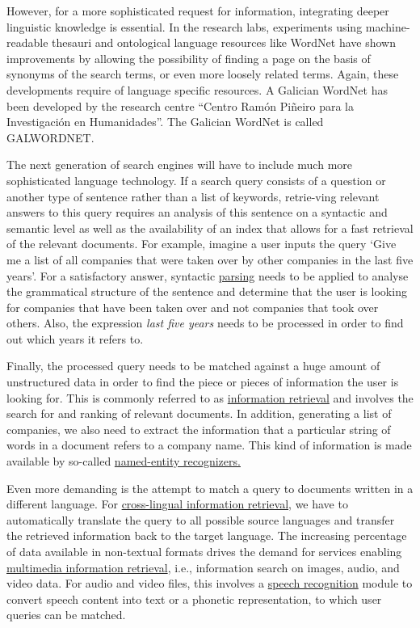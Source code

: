 \begin{multicols}{2}
\begin{itemize}
\begin{multicols}{2}
However, for a more sophisticated request for information, integrating deeper linguistic knowledge is essential. In the research labs, experiments using machine-readable thesauri and ontological language resources like WordNet have shown improvements by allowing the possibility of finding a page on the basis of synonyms of the search terms, or even more loosely related terms. Again, these developments require of language specific resources. A Galician WordNet has been developed by the research centre “Centro Ramón Piñeiro para la Investigación en Humanidades”\cite{GAL-Nota24}. The Galician WordNet is called GALWORDNET.

The next generation of search engines will have to include much more sophisticated language technology. If a search query consists of a question or another type of sentence rather than a list of keywords, retrie-ving relevant answers to this query requires an analysis of this sentence on a syntactic and semantic level as well as the availability of an index that allows for a fast retrieval of the relevant documents. For example, imagine a user inputs the query ‘Give me a list of all companies that were taken over by other companies in the last five years’. For a satisfactory answer, syntactic \uline{parsing} needs to be applied to analyse the grammatical structure of the sentence and determine that the user is looking for companies that have been taken over and not companies that took over others. Also, the expression \textit{last five years} needs to be processed in order to find out which years it refers to. 

Finally, the processed query needs to be matched against a huge amount of unstructured data in order to find the piece or pieces of information the user is looking for. This is commonly referred to as \uline{information retrieval} and involves the search for and ranking of relevant documents. In addition, generating a list of companies, we also need to extract the information that a particular string of words in a document refers to a company name. This kind of information is made available by so-called \uline{named-entity recognizers.} 

Even more demanding is the attempt to match a query to documents written in a different language. For \uline{cross-lingual information retrieval}, we have to automatically translate the query to all possible source languages and transfer the retrieved information back to the target language. The increasing percentage of data available in non-textual formats drives the demand for services enabling \uline{multimedia information retrieval}, i.e., information search on images, audio, and video data. For audio and video files, this involves a \uline{speech recognition} module to convert speech content into text or a phonetic representation, to which user queries can be matched.


\end{multicols}
\end{itemize}
\end{multicols}
